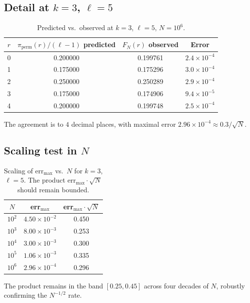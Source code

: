 \documentclass[11pt,a4paper]{article}
\theoremstyle{plain}
\theoremstyle{definition}
\newcommand{\PiP}{\pi_{\mathrm{perm}}}
\begin{document}
\subsection{Detail at $k = 3$, $\ell = 5$}

\begin{table}[h!]
\centering
\caption{Predicted vs.\ observed at $k = 3$, $\ell = 5$, $N = 10^6$.}
\begin{tabular}{c c c c}
\toprule
$r$ & $\PiP(r)/(\ell-1)$ predicted & $F_N(r)$ observed & Error \\
\midrule
0 & 0.200000 & 0.199761 & $2.4 \times 10^{-4}$ \\
1 & 0.175000 & 0.175296 & $3.0 \times 10^{-4}$ \\
2 & 0.250000 & 0.250289 & $2.9 \times 10^{-4}$ \\
3 & 0.175000 & 0.174906 & $9.4 \times 10^{-5}$ \\
4 & 0.200000 & 0.199748 & $2.5 \times 10^{-4}$ \\
\bottomrule
\end{tabular}
\end{table}

The agreement is to $4$ decimal places, with maximal error
$2.96 \times 10^{-4} \approx 0.3 / \sqrt{N}$.

\subsection{Scaling test in $N$}

\begin{table}[h!]
\centering
\caption{Scaling of $\mathrm{err}_{\max}$ vs.\ $N$ for $k=3$, $\ell=5$. The product
$\mathrm{err}_{\max} \cdot \sqrt{N}$ should remain bounded.}
\begin{tabular}{c c c}
\toprule
$N$ & err$_{\max}$ & err$_{\max} \cdot \sqrt{N}$ \\
\midrule
$10^2$ & $4.50 \times 10^{-2}$ & 0.450 \\
$10^3$ & $8.00 \times 10^{-3}$ & 0.253 \\
$10^4$ & $3.00 \times 10^{-3}$ & 0.300 \\
$10^5$ & $1.06 \times 10^{-3}$ & 0.335 \\
$10^6$ & $2.96 \times 10^{-4}$ & 0.296 \\
\bottomrule
\end{tabular}
\end{table}

The product remains in the band $[0.25, 0.45]$ across four decades of $N$,
robustly confirming the $N^{-1/2}$ rate.
\end{document}
